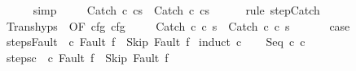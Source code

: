 \begin{isabellebody}
\ \ \ \ \isamarkupfalse%
\ simp\isanewline
\ \ \isamarkupfalse%
\ {\isachardoublequoteopen}{\isasymGamma}{\isasymturnstile}\ {\isacharparenleft}Catch\ c\ cs{\isacharparenright}\ {\isasymrightarrow}\ {\isacharparenleft}Catch\ c\ cs{\isacharprime}{\isacharprime}{\isacharparenright}{\isachardoublequoteclose}\isanewline
\ \ \ \ \isamarkupfalse%
\ {\isacharparenleft}rule\ step{\isachardot}Catch{\isacharparenright}\isanewline
\ \ \isamarkupfalse%
\ \isamarkupfalse%
\ Trans{\isachardot}hyps\ {\isacharparenleft}{}{\isacharparenright}\ {\isacharbrackleft}OF\ cfg{\isacharprime}{\isacharprime}\ cfg\isanewline
\ \ \isamarkupfalse%
\ {\isachardoublequoteopen}{\isasymGamma}{\isasymturnstile}\ {\isacharparenleft}Catch\ c\ c\ s{\isacharprime}{\isacharprime}{\isacharparenright}\ {\isasymrightarrow}\isactrlsup {\isacharasterisk}\ {\isacharparenleft}Catch\ c\ c\ s{\isacharprime}{\isacharparenright}{\isachardoublequoteclose}\ \isacommand{{\isachardot}}\isamarkupfalse%
\isanewline
\ \ \isamarkupfalse%
\ \isamarkupfalse%
\ {\isacharquery}case\ \isacommand{{\isachardot}}\isamarkupfalse%
\ \ \ \ \ \ \isanewline
{}\isamarkupfalse%
%
\endisatagproof
{\isafoldproof}%
%
\isadelimproof
\isanewline
%
\endisadelimproof
\isanewline
{}\isamarkupfalse%
\ steps{\isacharunderscore}Fault{\isacharcolon}\ {\isachardoublequoteopen}{\isasymGamma}{\isasymturnstile}\ {\isacharparenleft}c{\isacharcomma}\ Fault\ f{\isacharparenright}\ {\isasymrightarrow}\isactrlsup {\isacharasterisk}\ {\isacharparenleft}Skip{\isacharcomma}\ Fault\ f{\isacharparenright}{\isachardoublequoteclose}\isanewline
%
\isadelimproof
%
\endisadelimproof
%
\isatagproof
{}\isamarkupfalse%
\ {\isacharparenleft}induct\ c{\isacharparenright}\isanewline
\ \ \isamarkupfalse%
\ {\isacharparenleft}Seq\ c\ c\isanewline
\ \ \isamarkupfalse%
\ steps{\isacharunderscore}c\ {\isachardoublequoteopen}{\isasymGamma}{\isasymturnstile}\ {\isacharparenleft}c\ Fault\ f{\isacharparenright}\ {\isasymrightarrow}\isactrlsup {\isacharasterisk}\ {\isacharparenleft}Skip{\isacharcomma}\ Fault\ f{\isacharparenright}{\isachardoublequoteclose}\ \isamarkupfalse%

\end{isabellebody}
